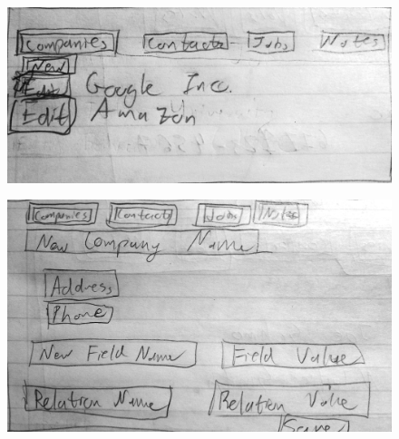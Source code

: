 \documentclass[12pt, letter]{article}
\begin{document}
\begin{figure}[H]
\centering
\begin{minipage}[t]{.4\linewidth}
\centering
\includegraphics[width=\textwidth]{story_1.jpg}
\end{minipage}
\hspace{.5cm}
\begin{minipage}[t]{.4\linewidth}
\centering
\includegraphics[width=\textwidth]{story_2.jpg}
\label{fig2}
\end{minipage}

\end{figure}
\end{document}
